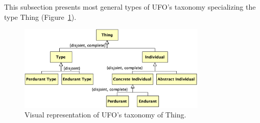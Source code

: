 \documentclass{article}
\newcommand{\me}[1]{\textsf{#1}}
\begin{document}
This subsection presents most general types of UFO's taxonomy specializing the type \me{Thing} (Figure~\ref{fig:01_taxonomy_thing}).

\begin{figure}[ht]
    \centering
    \includegraphics[width=0.8\textwidth]{diagrams/Thing_Diagram.png}
    \caption{Visual representation of UFO's taxonomy of \me{Thing}.}
    \label{fig:01_taxonomy_thing}
\end{figure}
\end{document}
